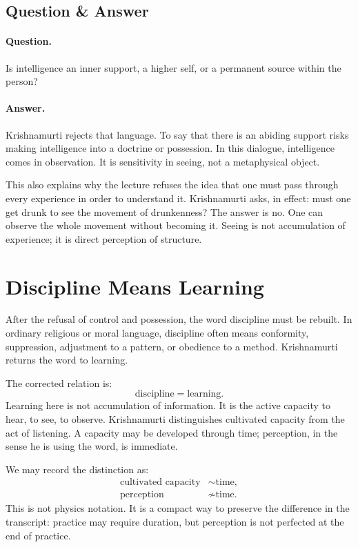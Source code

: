 \subsection{Question \& Answer}

\paragraph{Question.}
Is intelligence an inner support, a higher self, or a permanent source within the person?

\paragraph{Answer.}
Krishnamurti rejects that language. To say that there is an abiding support risks making intelligence into a doctrine or possession. In this dialogue, intelligence comes in observation. It is sensitivity in seeing, not a metaphysical object.

This also explains why the lecture refuses the idea that one must pass through every experience in order to understand it. Krishnamurti asks, in effect: must one get drunk to see the movement of drunkenness? The answer is no. One can observe the whole movement without becoming it. Seeing is not accumulation of experience; it is direct perception of structure.

\section{Discipline Means Learning}

After the refusal of control and possession, the word discipline must be rebuilt. In ordinary religious or moral language, discipline often means conformity, suppression, adjustment to a pattern, or obedience to a method. Krishnamurti returns the word to learning.

The corrected relation is:
\begin{equation}
\text{discipline} = \text{learning}.
\end{equation}
Learning here is not accumulation of information. It is the active capacity to hear, to see, to observe. Krishnamurti distinguishes cultivated capacity from the act of listening. A capacity may be developed through time; perception, in the sense he is using the word, is immediate.

We may record the distinction as:
\begin{align}
\text{cultivated capacity} &\sim \text{time},\\
\text{perception} &\not\sim \text{time}.
\end{align}
This is not physics notation. It is a compact way to preserve the difference in the transcript: practice may require duration, but perception is not perfected at the end of practice.

